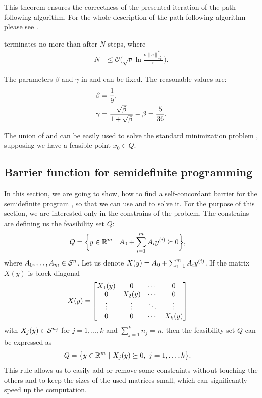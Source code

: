 This theorem ensures the correctness of the presented iteration of the path-following algorithm.
For the whole description of the path-following algorithm please see .



\begin{theorem}
   terminates no more than after $N$ steps, where
  \begin{align}
    N &\leq \mathcal{O}\Bigg(\sqrt{\nu}\ln\frac{\nu \|c\|^*_{x^*_F}}{\varepsilon}\Bigg).
  \end{align}
\end{theorem}

The parameters $\beta$ and $\gamma$ in  and  can be fixed. The reasonable values are:
\begin{align}
  \beta &= \frac{1}{9},\labeleq{SDP:scb:beta}\\
  \gamma &= \frac{\sqrt{\beta}}{1+\sqrt{\beta}} - \beta = \frac{5}{36}.\labeleq{SDP:scb:gamma}
\end{align}

The union of  and  can be easily used to solve the standard minimization problem , supposing we have a feasible point $x_0\in Q$.

\subsection{Barrier function for semidefinite programming}
In this section, we are going to show, how to find a self-concordant barrier for the semidefinite program , so that we can use  and  to solve it.
For the purpose of this section, we are interested only in the constrains of the problem.
The constrains are defining us the feasibility set $Q$:
\begin{align}
  Q &= \bigg\{y\in\mathbb{R}^m\ |\ A_0 + \sum_{i=1}^mA_iy^{(i)} \succeq 0\bigg\},
\end{align}
where $A_0, \ldots, A_m \in\mathcal{S}^n$.
Let us denote $X(y) = A_0 + \sum_{i=1}^mA_iy^{(i)}$.
If the matrix $X(y)$ is block diagonal
\begin{align}
  X(y) &= \begin{bmatrix}
          X_1(y) & 0      & \cdots & 0      \\
          0      & X_2(y) & \cdots & 0      \\
          \vdots & \vdots & \ddots & \vdots \\
          0      & 0      & \cdots & X_k(y)
        \end{bmatrix} \labeleq{SDP:bf:bd}
\end{align}
with $X_j(y)\in\mathcal{S}^{n_j}$ for $j = 1, \ldots, k$ and $\sum_{j=1}^k n_j = n$, then the feasibility set $Q$ can be expressed as
\begin{align}
  Q &= \big\{y\in\mathbb{R}^m\ |\ X_j(y) \succeq 0,\ j = 1,\ldots, k\big\}.
\end{align}
This rule allows us to easily add or remove some constraints without touching the others and to keep the sizes of the used matrices small, which can significantly speed up the computation.

